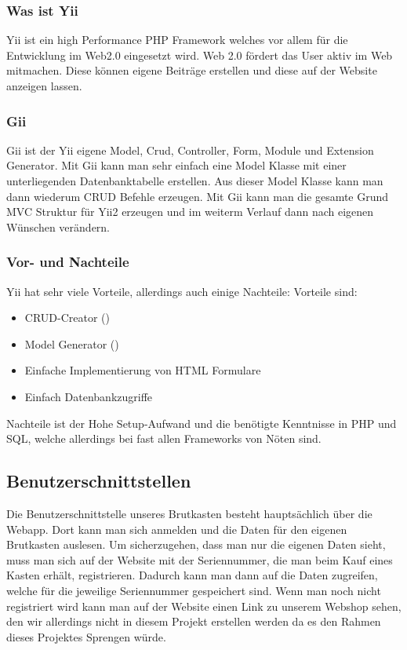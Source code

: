 \subsubsection{Was ist Yii}
Yii ist ein high Performance PHP Framework welches vor allem für die Entwicklung im Web2.0 eingesetzt wird. Web 2.0 fördert das User aktiv im Web mitmachen. Diese können eigene Beiträge erstellen und diese auf der Website anzeigen lassen.\cite{Web_2}

\subsubsection{Gii} \label{sec:gii}
Gii ist der Yii eigene Model, Crud, Controller, Form, Module und Extension Generator. Mit Gii kann man sehr einfach eine Model Klasse mit einer unterliegenden Datenbanktabelle erstellen. Aus dieser Model Klasse kann man dann wiederum CRUD Befehle erzeugen. Mit Gii kann man die gesamte Grund MVC Struktur für Yii2 erzeugen und im weiterm Verlauf dann nach eigenen Wünschen verändern.

\subsubsection{Vor- und Nachteile}
Yii hat sehr viele Vorteile, allerdings auch einige Nachteile:
\newline
Vorteile sind:

\begin{itemize}
	\item CRUD-Creator ()
	\item Model Generator ()
	\item Einfache Implementierung von HTML Formulare
	\item Einfach Datenbankzugriffe
\end{itemize}

Nachteile ist der Hohe Setup-Aufwand und die benötigte Kenntnisse in PHP und SQL, welche allerdings bei fast allen Frameworks von Nöten sind.


\subsection{Benutzerschnittstellen} 

Die Benutzerschnittstelle unseres Brutkasten besteht hauptsächlich über die Webapp. Dort kann man sich anmelden und die Daten für den eigenen Brutkasten auslesen. Um sicherzugehen, dass man nur die eigenen Daten sieht, muss man sich auf der Website mit der Seriennummer, die man beim Kauf eines Kasten erhält, registrieren. Dadurch kann man dann auf die Daten zugreifen, welche für die jeweilige Seriennummer gespeichert sind.
\newline
Wenn man noch nicht registriert wird kann man auf der Website einen Link zu unserem Webshop sehen, den wir allerdings nicht in diesem Projekt erstellen werden da es den Rahmen dieses Projektes Sprengen würde.
\newpage
